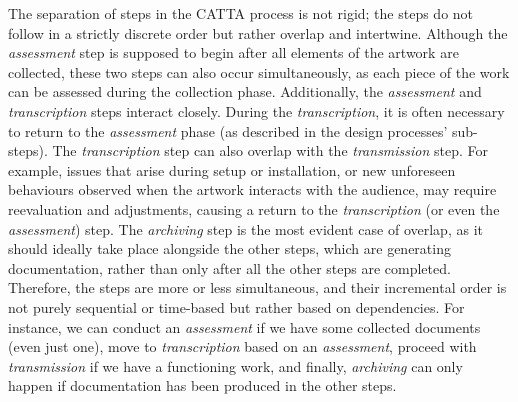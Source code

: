 The separation of steps in the CATTA process is not rigid; the steps do not follow in a strictly discrete order but rather overlap and intertwine. Although the \textit{assessment} step is supposed to begin after all elements of the artwork are collected, these two steps can also occur simultaneously, as each piece of the work can be assessed during the collection phase. Additionally, the \textit{assessment} and \textit{transcription} steps interact closely. During the \textit{transcription}, it is often necessary to return to the \textit{assessment} phase (as described in the design processes’ sub-steps). The \textit{transcription} step can also overlap with the \textit{transmission} step. For example, issues that arise during setup or installation, or new unforeseen behaviours observed when the artwork interacts with the audience, may require reevaluation and adjustments, causing a return to the \textit{transcription} (or even the \textit{assessment}) step. The \textit{archiving} step is the most evident case of overlap, as it should ideally take place alongside the other steps, which are generating documentation, rather than only after all the other steps are completed. Therefore, the steps are more or less simultaneous, and their incremental order is not purely sequential or time-based but rather based on dependencies. For instance, we can conduct an \textit{assessment} if we have some collected documents (even just one), move to \textit{transcription} based on an \textit{assessment}, proceed with \textit{transmission} if we have a functioning work, and finally, \textit{archiving} can only happen if documentation has been produced in the other steps.

